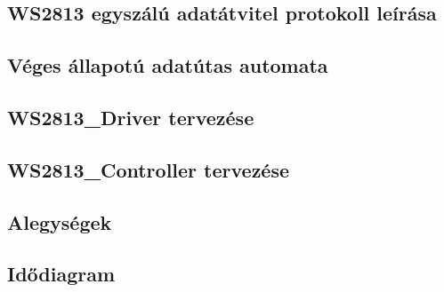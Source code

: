 \subsection{WS2813 egyszálú adatátvitel protokoll leírása}


\subsection{Véges állapotú adatútas automata}


\subsection{WS2813\_Driver tervezése}


\subsection{WS2813\_Controller tervezése}


\subsection{Alegységek}


\subsection{Idődiagram}
